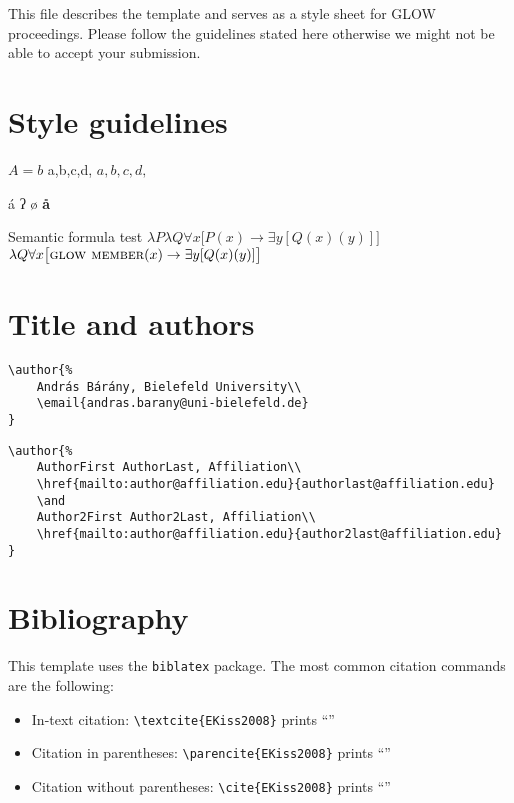This file describes the template and serves as a style sheet for GLOW proceedings.
Please follow the guidelines stated here otherwise we might not be able to accept
your submission.

\section{Style guidelines}

\layout

\ea
    $A = b$ a,b,c,d, $a,b,c,d,$
\z

\ea
    \Acc{} á ʔ ø \textbf{å}
\z

\ea Semantic formula test
\ea $\lambda P\lambda Q\forall x\big[P(x)\rightarrow \exists y[Q(x)(y)]\big]$
\ex $\lambda Q\forall x\big[\textsc{glow member}(x)\rightarrow\exists y[Q(x)(y)]\big]$
\z\z

\section{Title and authors}

\begin{verbatim}
\author{%
    András Bárány, Bielefeld University\\
    \email{andras.barany@uni-bielefeld.de}
}
\end{verbatim}

\begin{verbatim}
\author{%
    AuthorFirst AuthorLast, Affiliation\\
    \href{mailto:author@affiliation.edu}{authorlast@affiliation.edu}
    \and
    Author2First Author2Last, Affiliation\\
    \href{mailto:author@affiliation.edu}{author2last@affiliation.edu}
}
\end{verbatim}

\section{Bibliography}

This template uses the \texttt{biblatex} package. The most common citation
commands are the following:

\begin{itemize}
    \item In-text citation: \verb+\textcite{EKiss2008}+ prints \enquote{\textcite{EKiss2008}}
    \item Citation in parentheses: \verb+\parencite{EKiss2008}+ prints \enquote{\parencite{EKiss2008}}
    \item Citation without parentheses: \verb+\cite{EKiss2008}+ prints \enquote{\cite{EKiss2008}}
\end{itemize}

